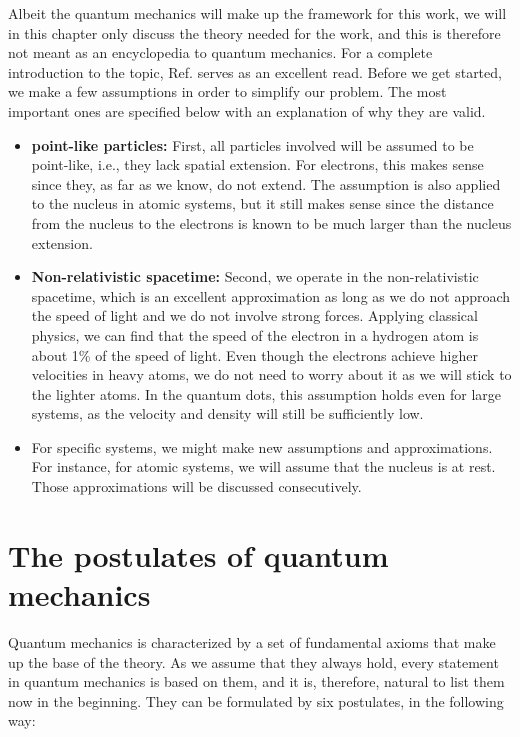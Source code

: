 Albeit the quantum mechanics will make up the framework for this work, we will in this chapter only discuss the theory needed for the work, and this is therefore not meant as an encyclopedia to quantum mechanics. For a complete introduction to the topic, Ref. \cite{griffiths_introduction_2005} serves as an excellent read. Before we get started, we make a few assumptions in order to simplify our problem. The most important ones are specified below with an explanation of why they are valid.

\begin{itemize}
	\item \textbf{point-like particles:} First, all particles involved will be assumed to be point-like, i.e., they lack spatial extension. For electrons, this makes sense since they, as far as we know, do not extend. The assumption is also applied to the nucleus in atomic systems, but it still makes sense since the distance from the nucleus to the electrons is known to be much larger than the nucleus extension.
	
	\item \textbf{Non-relativistic spacetime:}  Second, we operate in the non-relativistic spacetime, which is an excellent approximation as long as we do not approach the speed of light and we do not involve strong forces. Applying classical physics, we can find that the speed of the electron in a hydrogen atom is about 1\% of the speed of light. Even though the electrons achieve higher velocities in heavy atoms, we do not need to worry about it as we will stick to the lighter atoms. In the quantum dots, this assumption holds even for large systems, as the velocity and density will still be sufficiently low.
	
	\item For specific systems, we might make new assumptions and approximations. For instance, for atomic systems, we will assume that the nucleus is at rest. Those approximations will be discussed consecutively. 
\end{itemize}

\section{The postulates of quantum mechanics} \label{sec:postulates}
Quantum mechanics is characterized by a set of fundamental axioms that make up the base of the theory. As we assume that they always hold, every statement in quantum mechanics is based on them, and it is, therefore, natural to list them now in the beginning. They can be formulated by six postulates, in the following way:

